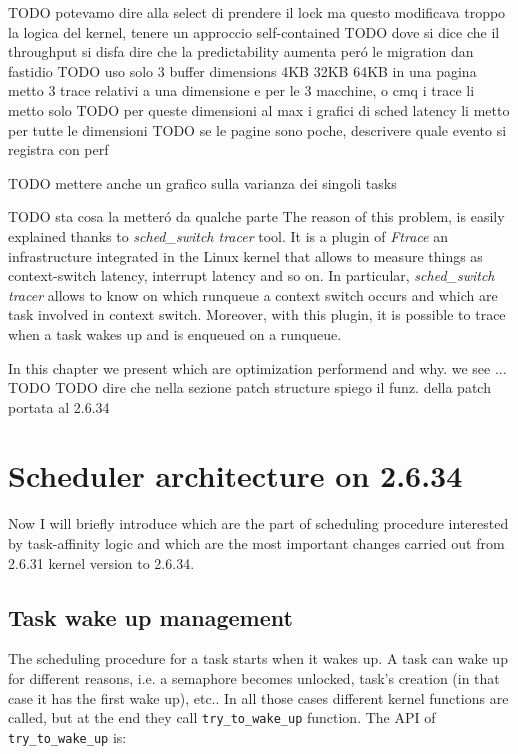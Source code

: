TODO potevamo dire alla select di prendere il lock ma questo modificava troppo la logica del kernel, tenere un approccio self-contained
TODO dove si dice che il throughput si disfa dire che la predictability aumenta per\'o le migration dan fastidio
TODO uso solo 3 buffer dimensions 4KB 32KB 64KB in una pagina metto 3 trace relativi a una dimensione e per le 3 macchine, o cmq i trace li metto solo
TODO per queste dimensioni al max i grafici di sched latency li metto per tutte le dimensioni
TODO se le pagine sono poche, descrivere quale evento si registra con perf

TODO mettere anche un grafico sulla varianza dei singoli tasks



TODO sta cosa la metter\'o da qualche parte
The reason of this problem, is easily explained thanks to \textit{sched\_switch tracer} tool. It is a plugin of \textit{Ftrace} an infrastructure integrated
in the Linux kernel that allows to measure things as context-switch latency, interrupt latency and so on. In particular, \textit{sched\_switch tracer} 
allows to know on which runqueue a context switch occurs and which are task involved in context switch. Moreover, with this plugin, it is possible to 
trace when a task wakes up and is enqueued on a runqueue.

In this chapter we present which are optimization performend and why. we see ... TODO 
TODO dire che nella sezione patch structure spiego il funz. della patch portata al 2.6.34

\section{Scheduler architecture on 2.6.34}

Now I will briefly introduce which are the part of scheduling procedure 
interested by task-affinity logic and which are the most important changes 
carried out from 2.6.31 kernel version to 2.6.34.

\subsection{Task wake up management}

The scheduling procedure for a task starts when it wakes up. A task can wake up
for different reasons, i.e. a semaphore becomes unlocked, task's creation
(in that case it has the first wake up), etc.. In all those cases different
kernel functions are called, but at the end they call 
\texttt{try\_to\_wake\_up} function. The API of \texttt{try\_to\_wake\_up} is:

